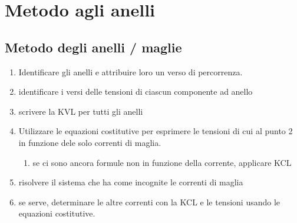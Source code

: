 \section{Metodo agli anelli}

\subsection{Metodo degli anelli / maglie}

\begin{enumerate}
    \item Identificare gli anelli e attribuire loro un verso di percorrenza.
    \item identificare i versi delle tensioni di ciascun componente ad anello
    \item scrivere la KVL per tutti gli anelli
    \item Utilizzare le equazioni costitutive per esprimere le tensioni di cui al punto 2 in funzione dele solo correnti di maglia.
        \begin{enumerate}
            \item se ci sono ancora formule non in funzione della corrente, applicare KCL
        \end{enumerate}
    \item risolvere il sistema che ha come incognite le correnti di maglia
    \item se serve, determinare le altre correnti con la KCL e le tensioni usando le equazioni costitutive.
\end{enumerate}




